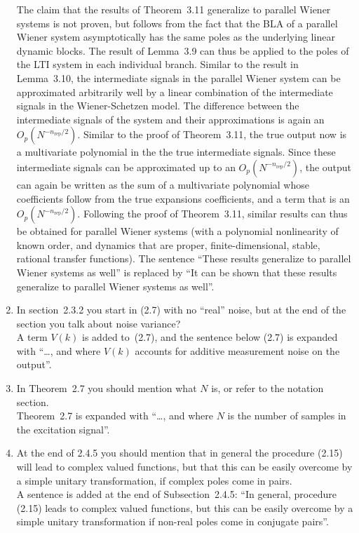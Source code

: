 \documentclass{article}
\newenvironment{answer}{\noindent\ignorespaces\color{blue}}{\noindent\ignorespacesafterend}
\newcommand{\ans}[1]{\begin{answer}#1\end{answer}}
\newcommand{\oldnewpage}[2]{\marginpar{{\color{black}#1} / {\color{red}#2}}}
\begin{document}
\begin{enumerate}
{		\oldnewpage{36--37, 68--69}{41--42, 73--74}The claim that the results of Theorem~3.11 generalize to parallel Wiener systems is not proven, but follows from the fact that the BLA of a parallel Wiener system asymptotically has the same poles as the underlying linear dynamic blocks. The result of Lemma~3.9 can thus be applied to the poles of the LTI system in each individual branch. Similar to the result in Lemma~3.10, the intermediate signals in the parallel Wiener system can be approximated arbitrarily well by a linear combination of the intermediate signals in the Wiener-Schetzen model. The difference between the intermediate signals of the system and their approximations is again an $O_p(N^{-n_\mathrm{rep}/2})$. Similar to the proof of Theorem~3.11, the true output now is a multivariate polynomial in the the true intermediate signals. Since these intermediate signals can be approximated up to an $O_p(N^{-n_\mathrm{rep}/2})$, the output can again be written as the sum of a multivariate polynomial whose coefficients follow from the true expansions coefficients, and a term that is an $O_p(N^{-n_\mathrm{rep}/2})$. Following the proof of Theorem~3.11, similar results can thus be obtained for parallel Wiener systems (with a polynomial nonlinearity of known order, and dynamics that are proper, finite-dimensional, stable, rational transfer functions). \oldnewpage{39}{43} The sentence ``These results generalize to parallel Wiener systems as well'' is replaced by ``It can be shown that these results generalize to parallel Wiener systems as well''.}
	\item In section~2.3.2 you start in (2.7) with no ``real'' noise, but at the end of the section you talk about noise variance?\\
		\ans{\oldnewpage{20}{22}A term $V(k)$ is added to~(2.7), and the sentence below (2.7) is expanded with ``\ldots, and where $V(k)$ accounts for additive measurement noise on the output''.}
	\item In Theorem~2.7 you should mention what $N$ is, or refer to the notation section.\\
		\ans{\oldnewpage{21}{23}Theorem~2.7 is expanded with ``\ldots, and where $N$ is the number of samples in the excitation signal''.}
	\item At the end of 2.4.5 you should mention that in general the procedure (2.15) will lead to complex valued functions, but that this can be easily overcome by a simple unitary transformation, if complex poles come in pairs.\\
		\ans{\oldnewpage{26}{28}A sentence is added at the end of Subsection~2.4.5: ``In general, procedure (2.15) leads to complex valued functions, but this can be easily overcome by a simple unitary transformation if non-real poles come in conjugate pairs''.}

\end{enumerate}
\end{document}
